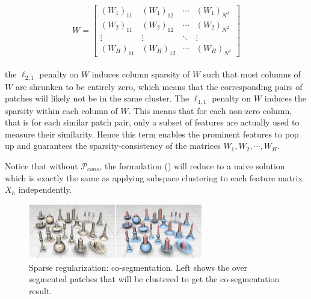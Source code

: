 \small{
\begin{equation}
 \label{eq:edgecotanoperator}
 W = {\left[ \begin{array}{cccc}
 (W_1)_{11} & (W_1)_{12} & \cdots & (W_1)_{N^2}\\
 (W_2)_{11} & (W_2)_{12} & \cdots & (W_2)_{N^2}\\
 \vdots & \vdots & \ddots & \vdots\\
 (W_{H})_{11} & (W_{H})_{12} & \cdots & (W_{H})_{N^2}
 \end{array}
 \right]}
\end{equation}
}
\\
the $\ell_{2,1}$ penalty on $W$ induces column sparsity of $W$ such that most columns of $W$ are shrunken to be entirely zero, which means that the corresponding pairs of patches will likely not be in the same cluster.
The $\ell_{1,1}$ penalty on $W$ induces the sparsity within each column of $W$.
This means that for each non-zero column, that is for each similar patch pair, only a subset of features are actually used to measure their similarity.
Hence this term enables the prominent features to pop up and guarantees the sparsity-consistency of the matrices $W_1,W_2,\cdots,W_H$.

Notice that without $\mathcal{P}_{cons}$, the formulation () will reduce to a naive solution which is exactly the same as applying subspace clustering to each feature matrix $X_{h}$ independently.

\begin{figure}[ht]
  \centering
  \includegraphics[width=3in]{images/co-segmentation}
  \caption{Sparse regularization: co-segmentation\cite{hu2012co}. Left shows the over segmented patches that will be clustered to get the co-segmentation result.}
\end{figure}



